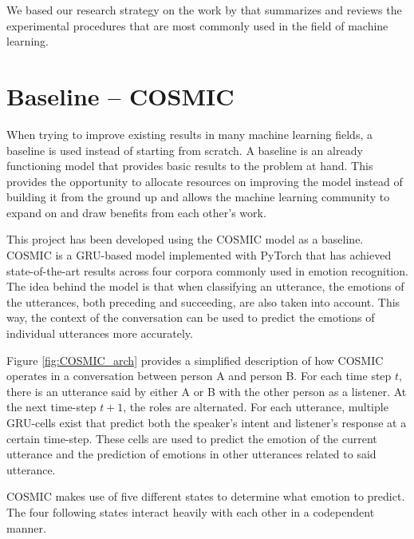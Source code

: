 \documentclass[nofilelist]{cslthse-msc}
\begin{document}
We based our research strategy on the work by \citet{bouthillier:hal-02447823} that summarizes and reviews the experimental procedures that are most commonly used in the field of machine learning.

\section{Baseline -- COSMIC}
When trying to improve existing results in many machine learning fields, a baseline is used instead of starting from scratch. A baseline is an already functioning model that provides basic results to the problem at hand. This provides the opportunity to allocate resources on improving the model instead of building it from the ground up and allows the machine learning community to expand on and draw benefits from each other's work. 

This project has been developed using the COSMIC model \citep{ghosal2020cosmic} as a baseline. COSMIC is a GRU-based model implemented with PyTorch that has achieved state-of-the-art results across four corpora commonly used in emotion recognition. The idea behind the model is that when classifying an utterance, the emotions of the utterances, both preceding and succeeding, are also taken into account. This way, the context of the conversation can be used to predict the emotions of individual utterances more accurately. 




Figure \ref{fig:COSMIC_arch} provides a simplified description of how COSMIC operates in a conversation between person A and person B. For each time step $t$, there is an utterance said by either A or B with the other person as a listener. At the next time-step $t+1$, the roles are alternated. For each utterance, multiple GRU-cells exist that predict both the speaker's intent and listener's response at a certain time-step. These cells are used to predict the emotion of the current utterance and the prediction of emotions in other utterances related to said utterance. 

COSMIC makes use of five different states to determine what emotion to predict. 
The four following states interact heavily with each other in a codependent manner. 
\end{document}
